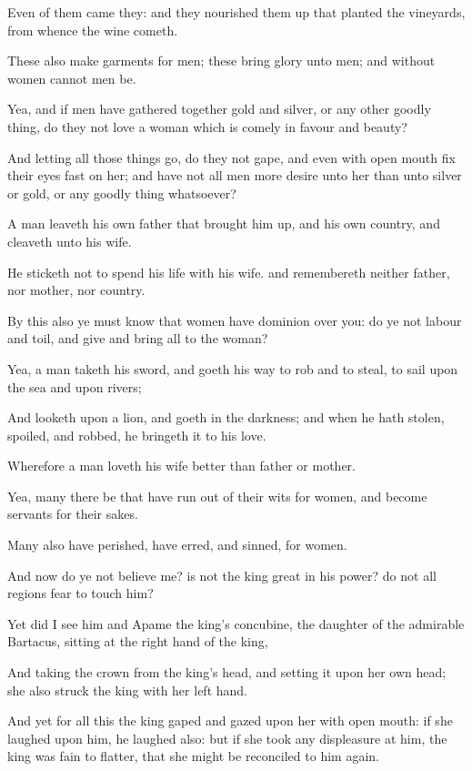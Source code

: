 {\par }{\PP {}Even of them came they: and they nourished them up that planted the vineyards, from whence the wine cometh.
\par }{\PP {}These also make garments for men; these bring glory unto men; and without women cannot men be.
\par }{\PP {}Yea, and if men have gathered together gold and silver, or any other goodly thing, do they not love a woman which is comely in favour and beauty?
\par }{\PP {}And letting all those things go, do they not gape, and even with open mouth fix their eyes fast on her; and have not all men more desire unto her than unto silver or gold, or any goodly thing whatsoever?
\par }{\PP {}A man leaveth his own father that brought him up, and his own country, and cleaveth unto his wife.
\par }{\PP {}He sticketh not to spend his life with his wife. and remembereth neither father, nor mother, nor country.
\par }{\PP {}By this also ye must know that women have dominion over you: do ye not labour and toil, and give and bring all to the woman?
\par }{\PP {}Yea, a man taketh his sword, and goeth his way to rob and to steal, to sail upon the sea and upon rivers;
\par }{\PP {}And looketh upon a lion, and goeth in the darkness; and when he hath stolen, spoiled, and robbed, he bringeth it to his love.
\par }{\PP {}Wherefore a man loveth his wife better than father or mother.
\par }{\PP {}Yea, many there be that have run out of their wits for women, and become servants for their sakes.
\par }{\PP {}Many also have perished, have erred, and sinned, for women.
\par }{\PP {}And now do ye not believe me? is not the king great in his power? do not all regions fear to touch him?
\par }{\PP {}Yet did I see him and Apame the king’s concubine, the daughter of the admirable Bartacus, sitting at the right hand of the king,
\par }{\PP {}And taking the crown from the king’s head, and setting it upon her own head; she also struck the king with her left hand.
\par }{\PP {}And yet for all this the king gaped and gazed upon her with open mouth: if she laughed upon him, he laughed also: but if she took any displeasure at him, the king was fain to flatter, that she might be reconciled to him again.
}
